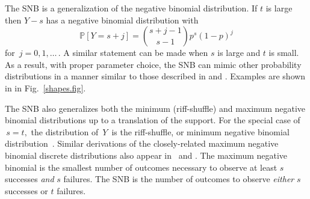 \documentclass[review]{elsarticle}
\begin{document}
The SNB is a generalization of the negative 
binomial distribution. If $t$ is large then $Y-s$ has a 
negative binomial distribution with
\begin{equation*}                                    %
\mathbb{P}[Y=s+j]        \label{nb1.eq}          
  = {{s+j-1}\choose{s-1}} p^s (1-p)^j
\end{equation*}
for $\,j=0, 1,\ldots\,$. A similar statement can be made when $s$ is large
and $t$ is small. As a result, with proper parameter choice, the SNB
can mimic other probability distributions in a manner similar to 
those described in \cite{Peizer1968} and \cite{Best1974}. Examples are
shown in in Fig.~\ref{shapes.fig}. 

The SNB also generalizes both the minimum (riff-shuffle) and maximum negative
binomial distributions up to a translation of the support.
For the special case of $\,s=t,$ the distribution of $\,Y\,$ is the
riff-shuffle, or minimum negative binomial distribution~\citep{Uppuluri1970}.
Similar derivations of the closely-related maximum negative binomial 
discrete distributions also appear in~\cite{Zhang2000}
and \cite{Zelterman2005}.
The maximum negative binomial is the smallest number of outcomes necessary to 
observe at least $s$ successes {\em and} $s$ failures. The SNB is the 
number of outcomes to observe {\em either} $s$ successes or $t$ failures.

\end{document}

